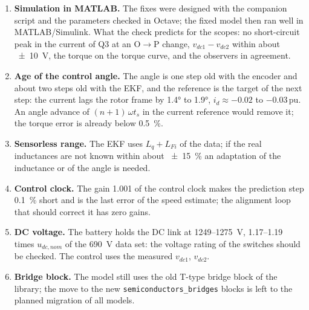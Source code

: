 \documentclass[10pt,a4paper]{scrartcl}
\newcommand{\ts}{t_s}
\newcommand{\pu}{\,\mathrm{pu}}
\newcommand{\code}[1]{\texttt{#1}}
\newcommand{\udcn}{u_{dc,nom}}
\begin{document}
\begin{onehalfspace}
\begin{enumerate}
\item \textbf{Simulation in MATLAB.} The fixes were designed with the companion script and the parameters checked in Octave; the fixed model then ran well in MATLAB/Simulink. What the check predicts for the scopes: no short-circuit peak in the current of Q3 at an O$\rightarrow$P change, $v_{dc1} - v_{dc2}$ within about \SI{\pm 10}{V}, the torque on the torque curve, and the observers in agreement.
\item \textbf{Age of the control angle.} The angle is one step old with the encoder and about two steps old with the EKF, and the reference is the target of the next step: the current lags the rotor frame by \ang{1.4} to \ang{1.9}, $i_d \approx -0.02$ to $-0.03\pu$. An angle advance of $(n+1)\,\omega\ts$ in the current reference would remove it; the torque error is already below \SI{0.5}{\percent}.
\item \textbf{Sensorless range.} The EKF uses $L_q + L_{Fi}$ of the data; if the real inductances are not known within about \SI{\pm 15}{\percent} an adaptation of the inductance or of the angle is needed.
\item \textbf{Control clock.} The gain 1.001 of the control clock makes the prediction step \SI{0.1}{\percent} short and is the last error of the speed estimate; the alignment loop that should correct it has zero gains.
\item \textbf{DC voltage.} The battery holds the DC link at 1249--\SI{1275}{V}, 1.17--1.19 times $\udcn$ of the \SI{690}{V} data set: the voltage rating of the switches should be checked. The control uses the measured $v_{dc1}$, $v_{dc2}$.
\item \textbf{Bridge block.} The model still uses the old T-type bridge block of the library; the move to the new \code{semiconductors\_bridges} blocks is left to the planned migration of all models.
\end{enumerate}


\end{onehalfspace}
\end{document}
